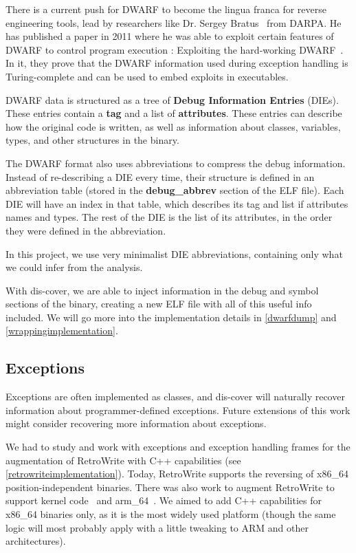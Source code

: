 \documentclass[a4paper,11pt,oneside]{report}
\begin{document}
There is a current push for DWARF to become the lingua franca for reverse 
engineering tools, lead by researchers like Dr. Sergey Bratus~\cite{bratus} 
from DARPA.
He has published a paper in 2011 where he was able to exploit certain features 
of DWARF to control program execution : Exploiting the hard-working 
DWARF~\cite{hardworkingdwarf}.
In it, they prove that the DWARF information used during exception handling
is Turing-complete and can be used to embed exploits in executables.

DWARF data is structured as a tree of \textbf{Debug Information Entries} 
(DIEs). These entries contain a \textbf{tag} and a list of
\textbf{attributes}.
These entries can describe how the original code is written, as well as
information about classes, variables, types, and other structures in the
binary.

The DWARF format also uses abbreviations to compress the debug information.
Instead of re-describing a DIE every time, their structure is defined in an
abbreviation table (stored in the \textbf{debug\_abbrev} section of the ELF
file).
Each DIE will have an index in that table, which describes its tag and list
if attributes names and types. The rest of the DIE is the list of its
attributes, in the order they were defined in the abbreviation.

In this project, we use very minimalist DIE abbreviations, containing only
what we could infer from the analysis.

With dis-cover, we are able to inject information in the debug and symbol 
sections of the binary, creating a new ELF file with all of this useful info 
included.
We will go more into the implementation details in \autoref{dwarfdump} and
\autoref{wrappingimplementation}.

\subsection{Exceptions}

Exceptions are often implemented as classes, and dis-cover will naturally 
recover information about programmer-defined exceptions.
Future extensions of this work might consider recovering more information about 
exceptions.

We had to study and work with exceptions and exception handling frames for 
the augmentation of RetroWrite with C++ capabilities (see
\autoref{retrowriteimplementation}).
Today, RetroWrite supports the reversing of x86\_64 position-independent 
binaries.
There was also work to augment RetroWrite to support kernel 
code~\cite{rwkernel} and arm\_64~\cite{rwarm}.
We aimed to add C++ capabilities for x86\_64 binaries only, as it is the most 
widely used platform (though the same logic will most probably apply with a 
little tweaking to ARM and other architectures).
\end{document}
